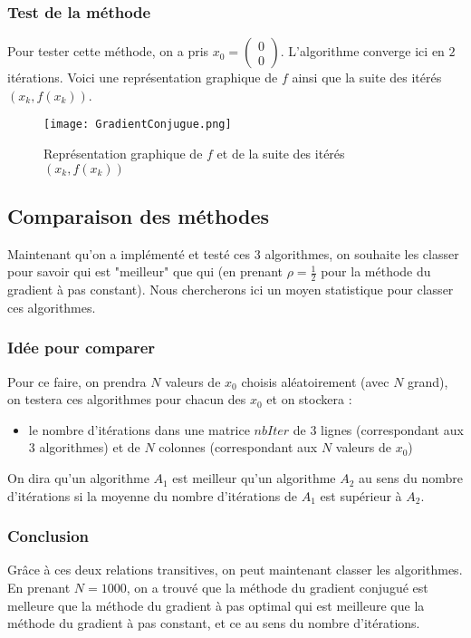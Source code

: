 \documentclass[9pt,a4paper]{article}
\begin{document}
\subsubsection{Test de la méthode}
Pour tester cette méthode, on a pris $x_0 = 
\begin{pmatrix}
    0\\
    0
\end{pmatrix}$.\newline
L'algorithme converge ici en $2$ itérations.\newline
Voici une représentation graphique de $f$ ainsi que la suite des itérés $(x_k,f(x_k))$.
\begin{figure}[h]
    \centering
    \texttt{[image: GradientConjugue.png]}
    \caption{Représentation graphique de $f$ et de la suite des itérés $(x_k,f(x_k))$}
    \label{fig:enter-label}
\end{figure}\newline
\subsection{Comparaison des méthodes}
Maintenant qu'on a implémenté et testé ces 3 algorithmes, on souhaite les classer pour savoir qui est "meilleur" que qui (en prenant $\rho = \frac{1}{2}$ pour la méthode du gradient à pas constant). Nous chercherons ici un moyen statistique pour classer ces algorithmes.
\subsubsection{Idée pour comparer}
Pour ce faire, on prendra $N$ valeurs de $x_0$ choisis aléatoirement (avec $N$ grand), on testera ces algorithmes pour chacun des $x_0$ et on stockera :
\begin{itemize}[label=\textbullet]
    \item le nombre d'itérations dans une matrice $nbIter$ de 3 lignes (correspondant aux 3 algorithmes) et de $N$ colonnes (correspondant aux $N$ valeurs de $x_0$)
\end{itemize}
On dira qu'un algorithme $A_1$ est meilleur qu'un algorithme $A_2$ au sens du nombre d'itérations si la moyenne du nombre d'itérations de $A_1$ est supérieur à $A_2$.
\subsubsection{Conclusion}
Grâce à ces deux relations transitives, on peut maintenant classer les algorithmes.\newline
En prenant $N = 1000$, on a trouvé que la méthode du gradient conjugué est melleure que la méthode du gradient à pas optimal qui est meilleure que la méthode du gradient à pas constant, et ce au sens du nombre d'itérations.\newline
\end{document}
